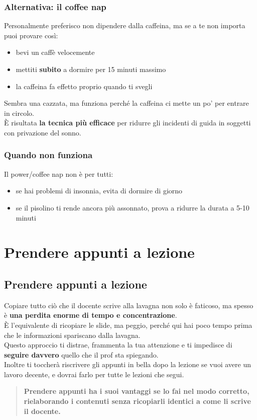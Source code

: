 \documentclass{article}
\begin{document}
\subsubsection{Alternativa: il coffee nap}
Personalmente preferisco non dipendere dalla caffeina, ma se a te non importa puoi provare così:
\begin{itemize}
\item bevi un caffè velocemente
\item mettiti \textbf{subito} a dormire per 15 minuti massimo
\item la caffeina fa effetto proprio quando ti svegli
\end{itemize}
Sembra una cazzata, ma funziona perché la caffeina ci mette un po' per entrare in circolo.\\
È risultata \textbf{la tecnica più efficace} per ridurre gli incidenti di guida in soggetti con privazione del sonno.


\subsubsection{Quando non funziona}
Il power/coffee nap non è per tutti:
\begin{itemize}
\item se hai problemi di insonnia, evita di dormire di giorno
\item se il pisolino ti rende ancora più assonnato, prova a ridurre la durata a 5-10 minuti
\end{itemize}


\section{Prendere appunti a lezione}
\subsection{Prendere appunti a lezione}
Copiare tutto ciò che il docente scrive alla lavagna non solo è faticoso, ma spesso è \textbf{una perdita enorme di tempo e concentrazione}.\\
È l'equivalente di ricopiare le slide, ma peggio, perché qui hai poco tempo prima che le informazioni spariscano dalla lavagna.\\
Questo approccio ti distrae, frammenta la tua attenzione e ti impedisce di \textbf{seguire davvero} quello che il prof sta spiegando.\\
Inoltre ti toccherà riscrivere gli appunti in bella dopo la lezione se vuoi avere un lavoro decente, e dovrai farlo per tutte le lezioni che segui.
\begin{quote}
\textbf{Prendere appunti ha i suoi vantaggi se lo fai nel modo corretto, rielaborando i contenuti senza ricopiarli identici a come li scrive il docente.}
\end{quote}
\end{document}
